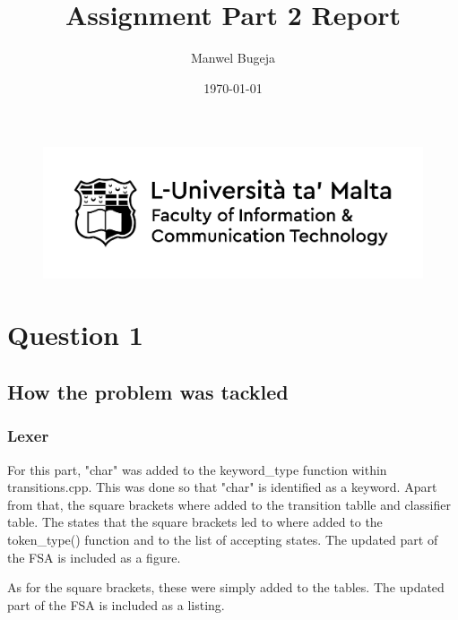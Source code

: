 \documentclass[a4paper, 12pt]{article}
\begin{document}
\begin{figure}
    \centering
    \includegraphics[width=1\textwidth]{Logo}
\end{figure}

\title{Assignment Part 2 Report}
\author{Manwel Bugeja}
\date{\today}
\maketitle

\tableofcontents
\newpage

\section{Question 1}
\subsection{How the problem was tackled} 
\subsubsection{Lexer}
For this part, "char" was added to the keyword\_type function within transitions.cpp. This was done so that "char" is identified as a keyword.
Apart from that, the square brackets where added to the transition tablle and classifier table. The states that the square brackets led to where added 
to the token\_type() function and to the list of accepting states. The updated part of the FSA is included as a figure.
\linebreak

As for the square brackets, these were simply added to the tables. The updated part of the FSA is included as a listing.
\end{document}
